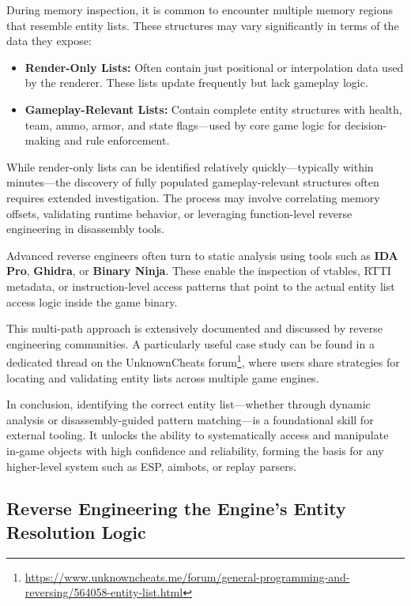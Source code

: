 During memory inspection, it is common to encounter multiple memory regions that resemble entity lists. These structures may vary significantly in terms of the data they expose:

\begin{itemize}
    \item \textbf{Render-Only Lists:} Often contain just positional or interpolation data used by the renderer. These lists update frequently but lack gameplay logic.
    \item \textbf{Gameplay-Relevant Lists:} Contain complete entity structures with health, team, ammo, armor, and state flags—used by core game logic for decision-making and rule enforcement.
\end{itemize}

While render-only lists can be identified relatively quickly—typically within minutes—the discovery of fully populated gameplay-relevant structures often requires extended investigation. The process may involve correlating memory offsets, validating runtime behavior, or leveraging function-level reverse engineering in disassembly tools.

Advanced reverse engineers often turn to static analysis using tools such as \textbf{IDA Pro}, \textbf{Ghidra}, or \textbf{Binary Ninja}. These enable the inspection of vtables, RTTI metadata, or instruction-level access patterns that point to the actual entity list access logic inside the game binary.

This multi-path approach is extensively documented and discussed by reverse engineering communities. A particularly useful case study can be found in a dedicated thread on the UnknownCheats forum\footnote{\url{https://www.unknowncheats.me/forum/general-programming-and-reversing/564058-entity-list.html}}, where users share strategies for locating and validating entity lists across multiple game engines.

\bigskip

In conclusion, identifying the correct entity list—whether through dynamic analysis or disassembly-guided pattern matching—is a foundational skill for external tooling. It unlocks the ability to systematically access and manipulate in-game objects with high confidence and reliability, forming the basis for any higher-level system such as ESP, aimbots, or replay parsers.




\subsection{Reverse Engineering the Engine's Entity Resolution Logic}

